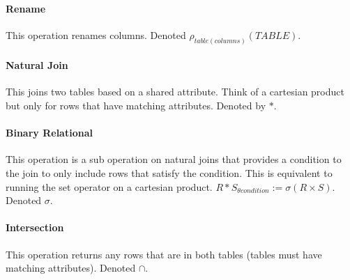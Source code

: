 \documentclass{article}
\begin{document}
\paragraph{Rename} %
\label{par:rename}
This operation renames columns. Denoted $\rho_{table(columns)}(TABLE)$.
\paragraph{Natural Join} %
\label{par:natural_join}
This joins two tables based on a shared attribute. Think of a cartesian product but only for rows that have matching attributes. Denoted by $*$.
\paragraph{Binary Relational} %
\label{par:binary_relational}
This operation is a sub operation on natural joins that provides a condition to the join to only include rows that satisfy the condition. This is equivalent to running the set operator on a cartesian product. $R*S_{\theta condition} := \sigma(R\times S)$. Denoted $\sigma$.
\paragraph{Intersection} %
\label{par:intersection}
This operation returns any rows that are in both tables (tables must have matching attributes). Denoted $\cap$.
\end{document}
